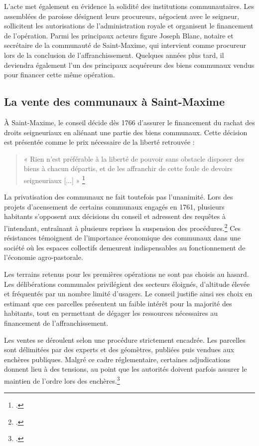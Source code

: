 \documentclass[12pt,a4paper]{report}
\begin{document}
L'acte met également en évidence la solidité des institutions communautaires. Les assemblées de paroisse désignent leurs procureurs, négocient avec le seigneur, sollicitent les autorisations de l'administration royale et organisent le financement de l'opération. Parmi les principaux acteurs figure Joseph Blanc, notaire et secrétaire de la communauté de Saint-Maxime, qui intervient comme procureur lors de la conclusion de l'affranchissement. Quelques années plus tard, il deviendra également l'un des principaux acquéreurs des biens communaux vendus pour financer cette même opération.


\subsection{La vente des communaux à Saint-Maxime}

À Saint-Maxime, le conseil décide dès 1766 d'assurer le financement du rachat des droits seigneuriaux en aliénant une partie des biens communaux. Cette décision est présentée comme le prix nécessaire de la liberté retrouvée :

\begin{quote}
	« Rien n'est préférable à la liberté de pouvoir sans obstacle disposer des biens à chacun départis, et de les affranchir de cette foule de devoirs seigneuriaux [...] »
	\footcite[32]{HViallet1993}
\end{quote}

La privatisation des communaux ne fait toutefois pas l'unanimité. Lors des projets d'acensement de certains communaux engagés en 1761, plusieurs habitants s'opposent aux décisions du conseil et adressent des requêtes à l'intendant, entraînant à plusieurs reprises la suspension des procédures.\footcite[70--71]{HViallet1993} Ces résistances témoignent de l'importance économique des communaux dans une société où les espaces collectifs demeurent indispensables au fonctionnement de l'économie agro-pastorale.

Les terrains retenus pour les premières opérations ne sont pas choisis au hasard. Les délibérations communales privilégient des secteurs éloignés, d'altitude élevée et fréquentés par un nombre limité d'usagers. Le conseil justifie ainsi ses choix en estimant que ces parcelles présentent un faible intérêt pour la majorité des habitants, tout en permettant de dégager les ressources nécessaires au financement de l'affranchissement.

Les ventes se déroulent selon une procédure strictement encadrée. Les parcelles sont délimitées par des experts et des géomètres, publiées puis vendues aux enchères publiques. Malgré ce cadre réglementaire, certaines adjudications donnent lieu à des tensions, au point que les autorités doivent parfois assurer le maintien de l'ordre lors des enchères.\footcite[127]{BordeVibertGuigue1971VieRuraleBeaufort}
\end{document}
